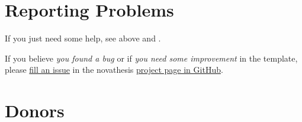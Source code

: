 \begin{center}  
\end{center}
 
%
%
%
%

\section{Reporting Problems}
\label{sec:reporting_problems}

If you just need some help, see above  and .

If you believe \emph{you found a bug} or if \emph{you need some improvement} in the template, please \href{https://github.com/joaomlourenco/novathesis/issues}{fill an issue} in the \gls{novathesis} \href{https://github.com/joaomlourenco/novathesis/issues}{project page in GitHub}.


\section{Donors}
\label{sec:donations}

